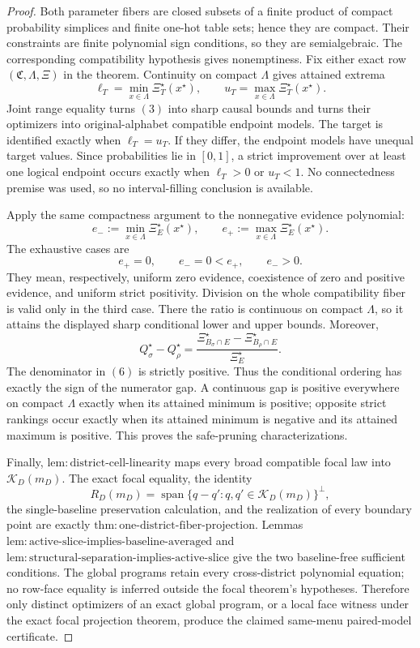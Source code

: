 \documentclass{article}
\begin{document}
\begin{proof}
Both parameter fibers are closed subsets of a finite product of compact probability
simplices and finite one-hot table sets; hence they are compact.  Their constraints
are finite polynomial sign conditions, so they are semialgebraic.  The corresponding
compatibility hypothesis gives nonemptiness.  Fix either exact row
\((\mathfrak C,\Lambda,\Xi)\) in the theorem.  Continuity on compact \(\Lambda\)
gives attained extrema
\[
\ell_T=\min_{x\in\Lambda}\Xi_T^\star(x^\star),
\qquad
u_T=\max_{x\in\Lambda}\Xi_T^\star(x^\star).
\tag{3}
\]
Joint range equality turns \((3)\) into sharp causal bounds and turns their
optimizers into original-alphabet compatible endpoint models.  The target is
identified exactly when \(\ell_T=u_T\).  If they differ, the endpoint models have
unequal target values.  Since probabilities lie in \([0,1]\), a strict improvement
over at least one logical endpoint occurs exactly when \(\ell_T>0\) or \(u_T<1\).
No connectedness premise was used, so no interval-filling conclusion is available.

Apply the same compactness argument to the nonnegative evidence polynomial:
\[
e_-:=\min_{x\in\Lambda}\Xi_E^\star(x^\star),
\qquad
e_+:=\max_{x\in\Lambda}\Xi_E^\star(x^\star).
\tag{4}
\]
The exhaustive cases are
\[
e_+=0,
\qquad
e_-=0<e_+,
\qquad
e_->0.
\tag{5}
\]
They mean, respectively, uniform zero evidence, coexistence of zero and positive
evidence, and uniform strict positivity.  Division on the whole compatibility fiber
is valid only in the third case.  There the ratio is continuous on compact
\(\Lambda\), so it attains the displayed sharp conditional lower and upper bounds.
Moreover,
\[
Q_\sigma^\star-Q_\rho^\star
=\frac{\Xi_{B_\sigma\cap E}^\star-
\Xi_{B_\rho\cap E}^\star}{\Xi_E^\star}.
\tag{6}
\]
The denominator in \((6)\) is strictly positive.  Thus the conditional ordering has
exactly the sign of the numerator gap.  A continuous gap is positive everywhere on
compact \(\Lambda\) exactly when its attained minimum is positive; opposite strict
rankings occur exactly when its attained minimum is negative and its attained
maximum is positive.  This proves the safe-pruning characterizations.

Finally, \(\mathrm{lem:district\text{-}cell\text{-}linearity}\) maps every broad
compatible focal law into \(\mathcal K_D(m_D)\).  The exact focal equality, the
identity
\[
R_D(m_D)=
\operatorname{span}\{q-q':q,q'\in\mathcal K_D(m_D)\}^{\perp},
\tag{7}
\]
the single-baseline preservation calculation, and the realization of every boundary
point are exactly
\(\mathrm{thm:one\text{-}district\text{-}fiber\text{-}projection}\).  Lemmas
\(\mathrm{lem:active\text{-}slice\text{-}implies\text{-}baseline\text{-}averaged}\)
and
\(\mathrm{lem:structural\text{-}separation\text{-}implies\text{-}active\text{-}slice}\)
give the two baseline-free sufficient conditions.  The global programs retain every
cross-district polynomial equation; no row-face equality is inferred outside the
focal theorem's hypotheses.  Therefore only distinct optimizers of an exact global
program, or a local face witness under the exact focal projection theorem, produce
the claimed same-menu paired-model certificate.
\end{proof}
\end{document}
